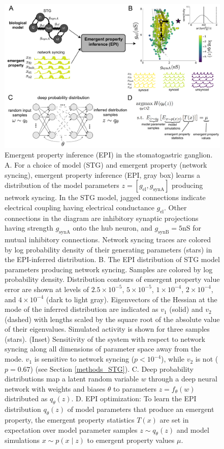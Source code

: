 \documentclass[11pt]{article}
\begin{document}
\begin{figure}
\begin{center}
\includegraphics[scale=0.32]{figures/fig1/fig1.pdf}
\end{center}
\caption{\small Emergent property inference (EPI) in the stomatogastric ganglion.  A. For a choice of model (STG) and emergent property (network syncing), emergent property inference (EPI, gray box) learns a distribution of the model parameters $z = \left[g_{\text{el}}, g_{\text{synA}} \right]$ producing network syncing.  In the STG model, jagged connections indicate electrical coupling having electrical conductance $g_{\text{el}}$. Other connections in the diagram are inhibitory synaptic projections having strength $g_{\text{synA}}$ onto the hub neuron, and $g_{\text{synB}}=5$nS for mutual inhibitory connections.  Network syncing traces are colored by log probability density of their generating parameters (stars) in the EPI-inferred distribution.  B. The EPI distribution of STG model parameters producing network syncing.  Samples are colored by log probability density.  Distribution contours of emergent property value error are shown at levels of $2.5 \times 10^{-5}$, $5 \times 10^{-5}$, $1 \times 10^{-4}$, $2 \times 10^{-4}$, and $4 \times 10^{-4}$ (dark to light gray).  Eigenvectors of the Hessian at the mode of the inferred distribution are indicated as $v_1$ (solid) and $v_2$ (dashed) with lengths scaled by the square root of the absolute value of their eigenvalues.  Simulated activity is shown for three samples (stars). (Inset) Sensitivity of the system with respect to network syncing along all dimensions of parameter space away from the mode.  $v_1$ is sensitive to network syncing ($p<10^{-4}$), while $v_2$ is not ($p=0.67$) (see Section \ref{methods_STG}).  C. Deep probability distributions map a latent random variable $w$ through a deep neural network with weights and biases $\theta$ to parameters $z = f_\theta(w)$ distributed as $q_\theta(z)$. D. EPI optimization: To learn the EPI distribution $q_\theta(z)$ of model parameters that produce an emergent property, the emergent property statistics $T(x)$ are set in expectation over model parameter samples $z \sim q_\theta(z)$ and model simulations $x \sim p(x \mid z)$ to emergent property values $\mu$.}
 \label{fig:STG}
\end{figure}
\end{document}
